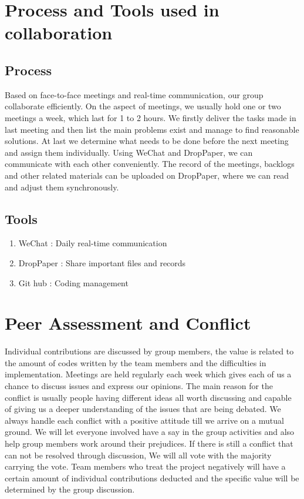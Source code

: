 \documentclass[a4paper,11pt]{article}
\begin{document}
\section{Process and Tools used in collaboration}
\subsection{Process}
Based on face-to-face meetings and real-time communication, our group collaborate efficiently. On the aspect of meetings, we usually hold one or two meetings a week, which last for 1 to 2 hours. We firstly deliver the tasks made in last meeting and then list the main problems exist and manage to find reasonable solutions. At last we determine what needs to be done before the next meeting and assign them individually. Using WeChat and DropPaper, we can communicate with each other conveniently. The record of the meetings, backlogs and other related materials can be uploaded on DropPaper, where we can read and adjust them synchronously.
\subsection{Tools}
\begin{enumerate}
\item WeChat : Daily real-time communication
\item DropPaper : Share important files and records 
\item Git hub : Coding management
\end{enumerate}
\section{Peer Assessment and Conflict}
Individual contributions are discussed by group members, the value is related to the amount of codes written by the team members and the difficulties in implementation. Meetings are held regularly each week which gives each of us a chance to discuss issues and express our opinions. The main reason for the conflict is usually people having different ideas all worth discussing and capable of giving us a deeper understanding of the issues that are being debated. We always handle each conflict with a positive attitude till we arrive on a mutual ground. We will let everyone involved have a say in the group activities and also help group members work around their prejudices. If there is still a conflict that can not be resolved through discussion, We will all vote with the majority carrying the vote. Team members who treat the project negatively will have a certain amount of individual contributions deducted and the specific value will be determined  by the group discussion.
\end{document}
